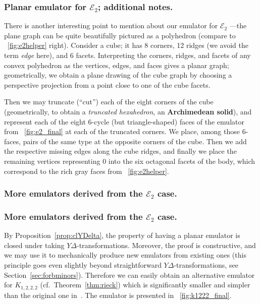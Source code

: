 \documentclass[envcountsect,envcountsame]{llncs}
\renewenvironment{accumulate}{}{}
\newcommand{\KKK}{\ensuremath{K_{1,2,2,2}}\xspace}
\newcommand{\EE}{\ensuremath{\mathcal{E}_2}\xspace}
\begin{document}
\begin{onlyaccum}
\subsubsection*{Planar emulator for \EE; additional notes.}
\end{onlyaccum}
\begin{accumulate}
\medskip
There is another interesting point to mention about our emulator for \EE
---the plane graph can be quite beautifully pictured as a polyhedron
(compare to \figurename~\ref{fig:e2helper} right).
Consider a cube; it has 8 corners, 12 ridges (we avoid the term \emph{edge}
here), and 6 facets. Interpreting the corners, ridges, and facets of any
convex polyhedron as the vertices, edges, and faces gives a planar graph;
geometrically, we obtain a plane drawing of the cube graph 
by choosing a perspective projection from a point close to one of the cube facets.

Then we may truncate (``cut'') each of the eight corners of the cube
(geometrically, to obtain a \emph{truncated hexahedron}, an {\bf Archimedean solid}),
and represent each of the eight $6$-cycle (but triangle-shaped) faces of the
emulator from \figurename~\ref{fig:e2_final} at each of the truncated
corners.
We place, among those $6$-faces, pairs of the same type at the
opposite corners of the cube. 
Then we add the respective missing edges along the cube ridges, 
and finally we place the remaining vertices representing $0$ into the
six octagonal facets of the body, which correspond to the rich gray faces
from \figurename~\ref{fig:e2helper}.

\end{accumulate}




\subsubsection*{More emulators derived from the \EE case.}
\begin{onlyaccum}
\subsubsection*{More emulators derived from the \EE case.}
\end{onlyaccum}

By Proposition~\ref{prop:clYDelta}, the property of having a planar
emulator is closed under taking {\ensuremath{Y\!\Delta}}-transformations. 
Moreover, the proof is constructive, and we may use it to mechanically
produce new emulators from existing ones (this principle goes even slightly beyond
straightforward ${Y\!\Delta}$-transformations, see Section~\ref{sec:forbminors}).
Therefore we can easily obtain an alternative emulator for \KKK
(cf.~Theorem~\ref{thm:rieck}) which is significantly smaller and simpler
than the original one in~\cite{cit:rieck}.
The emulator is presented in \figurename~\ref{fig:k1222_final}.
\end{document}
